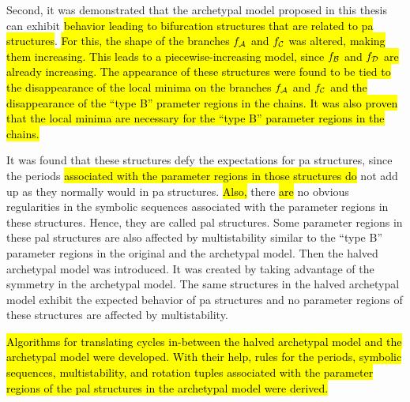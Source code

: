 \clearpage

Second, it was demonstrated that the archetypal model proposed in this thesis can exhibit \hl{behavior leading to bifurcation structures that are related to \gls{pa} structures}.
\hl{
	For this, the shape of the branches $f_{\mathcal{A}}$ and $f_{\mathcal{C}}$ was altered, making them increasing.
	This leads to a piecewise-increasing model, since $f_{\mathcal{B}}$ and $f_{\mathcal{D}}$ are already increasing.
	The appearance of these structures were found to be tied to the disappearance of the local minima on the branches $f_{\mathcal{A}}$ and $f_{\mathcal{C}}$ and the disappearance of the ``type B'' prameter regions in the chains.
	It was also proven that the local minima are necessary for the ``type B'' parameter regions in the chains.
}

It was found that these structures defy the expectations for \gls{pa} structures, since the periods \hl{associated with the parameter regions in those structures do} not add up as they normally would in \gls{pa} structures.
\hl{Also,} there \hl{are} no obvious regularities in the symbolic sequences associated with the parameter regions in these structures.
Hence, they are called \gls{pal} structures.
Some parameter regions in these \gls{pal} structures are also affected by multistability similar to the ``type B'' parameter regions in the original and the archetypal model.
Then the halved archetypal model was introduced.
It was created by taking advantage of the symmetry in the archetypal model.
The same structures in the halved archetypal model exhibit the expected behavior of \gls{pa} structures and no parameter regions of these structures are affected by multistability.

\hl{
	Algorithms for translating cycles in-between the halved archetypal model and the archetypal model were developed.
	With their help, rules for the periods, symbolic sequences, multistability, and rotation tuples associated with the parameter regions of the \gls{pal} structures in the archetypal model were derived.
}
